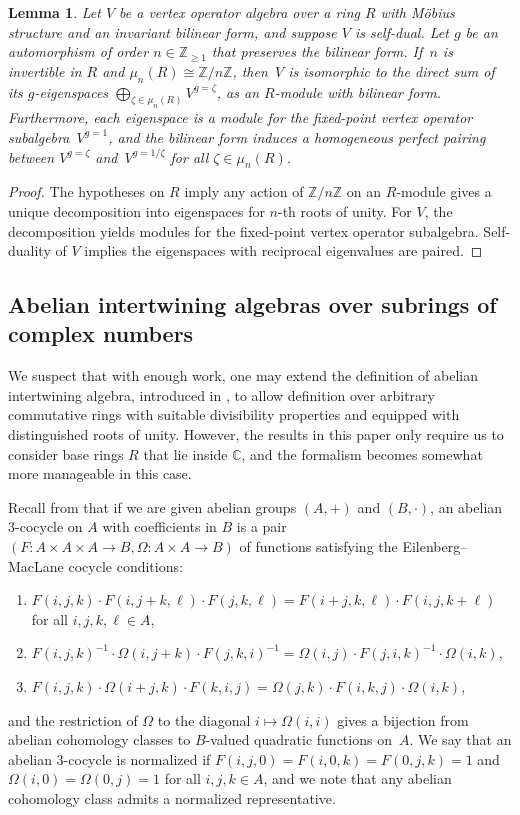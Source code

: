 \documentclass[pdftex]{sigma}
\newcommand{\bC}{\mathbb{C}}
\newcommand{\bZ}{\mathbb{Z}}
\newtheorem{lem}[thm]{Lemma}
\theoremstyle{definition}
\begin{document}
\begin{lem} \label{lem:decomposition-is-still-self-dual}Let $V$ be a vertex operator algebra over a ring $R$ with M\"obius structure and an invariant bilinear form, and suppose $V$ is self-dual. Let $g$ be an automorphism of order $n \in \bZ_{\geq 1}$ that preserves the bilinear form. If~$n$ is invertible in $R$ and $\mu_n(R) \cong \bZ/n\bZ$, then~$V$ is isomorphic to the direct sum of its $g$-eigenspaces $\bigoplus_{\zeta \in \mu_n(R)} V^{g = \zeta}$, as an $R$-module with bilinear form. Furthermore, each eigenspace is a module for the fixed-point vertex operator subalgebra~$V^{g=1}$, and the bilinear form induces a homogeneous perfect pairing between $V^{g = \zeta}$ and~$V^{g = 1/\zeta}$ for all $\zeta \in \mu_n(R)$.
\end{lem}
\begin{proof}The hypotheses on $R$ imply any action of $\bZ/n\bZ$ on an $R$-module gives a unique decomposition into eigenspaces for $n$-th roots of unity. For $V$, the decomposition yields modules for the fixed-point vertex operator subalgebra. Self-duality of $V$ implies the eigenspaces with reciprocal eigenvalues are paired.
\end{proof}

\subsection{Abelian intertwining algebras over subrings of complex numbers}

We suspect that with enough work, one may extend the definition of abelian intertwining algebra, introduced in \cite{DL93}, to allow definition over arbitrary commutative rings with suitable divisibility properties and equipped with distinguished roots of unity. However, the results in this paper only require us to consider base rings $R$ that lie inside $\bC$, and the formalism becomes somewhat more manageable in this case.

Recall from \cite{M52} that if we are given abelian groups $(A,+)$ and $(B,\cdot)$, an abelian 3-cocycle on $A$ with coefficients in $B$ is a pair $(F\colon A \times A \times A \to B, \Omega\colon A \times A \to B)$ of functions satisfying the Eilenberg--MacLane cocycle conditions:
\begin{enumerate}\itemsep=0pt
\item[1)] $F(i,j,k) \cdot F(i,j+k,\ell) \cdot F(j,k,\ell) = F(i+j,k,\ell) \cdot F(i,j,k+\ell)$ for all $i,j,k,\ell \in A$,
\item[2)] $F(i,j,k)^{-1} \cdot \Omega(i,j+k) \cdot F(j,k,i)^{-1} = \Omega(i,j) \cdot F(j,i,k)^{-1} \cdot \Omega(i,k)$,
\item[3)] $F(i,j,k) \cdot \Omega(i+j,k) \cdot F(k,i,j) = \Omega(j,k) \cdot F(i,k,j) \cdot \Omega(i,k)$,
\end{enumerate}
and the restriction of $\Omega$ to the diagonal $i \mapsto \Omega(i,i)$ gives a bijection from abelian cohomology classes to $B$-valued quadratic functions on~$A$. We say that an abelian 3-cocycle is normalized if $F(i,j,0) = F(i,0,k) = F(0,j,k) = 1$ and $\Omega(i,0) = \Omega(0,j) = 1$ for all $i,j,k \in A$, and we note that any abelian cohomology class admits a normalized representative.
\end{document}
